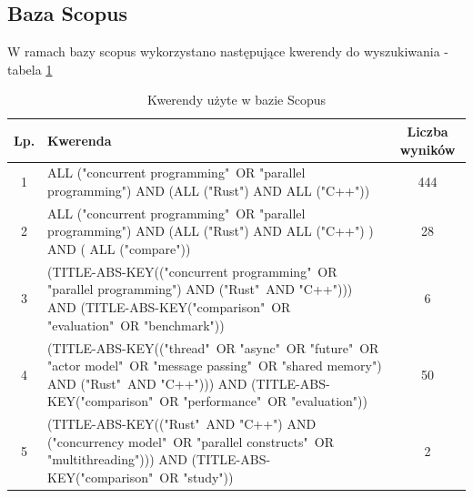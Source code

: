 \subsection{Baza Scopus}
W ramach bazy scopus wykorzystano następujące kwerendy do wyszukiwania - tabela \ref{table:literatureReviewQueries}

\begin{table}[H]
    \caption{Kwerendy użyte w bazie Scopus \protect \footnotemark}
    \label{table:literatureReviewQueries}
    \begin{tabular}{|c|p{11cm}|c|}
    \hline
    Lp. & Kwerenda & Liczba wyników \\ \hline
    1 & ALL ("concurrent programming"\ OR "parallel programming") AND (ALL ("Rust") AND ALL ("C++")) & 444 \\ \hline

    2 & ALL ("concurrent programming"\ OR "parallel programming") AND (ALL ("Rust") AND ALL ("C++") ) AND ( ALL ("compare")) & 28 \\ \hline

    3 & (TITLE-ABS-KEY(("concurrent programming"\ OR "parallel programming") AND ("Rust"\ AND "C++"))) AND (TITLE-ABS-KEY("comparison"\ OR "evaluation"\ OR "benchmark")) & 6 \\ \hline

    4 & (TITLE-ABS-KEY(("thread"\ OR "async"\ OR "future"\ OR "actor model"\ OR "message passing"\ OR "shared memory") AND ("Rust"\ AND "C++"))) AND (TITLE-ABS-KEY("comparison"\ OR "performance"\ OR "evaluation")) & 50 \\ \hline

    5 & (TITLE-ABS-KEY(("Rust"\ AND "C++") AND ("concurrency model"\ OR "parallel constructs"\ OR "multithreading"))) AND (TITLE-ABS-KEY("comparison"\ OR "study")) & 2 \\ \hline

    \end{tabular}
\end{table}


